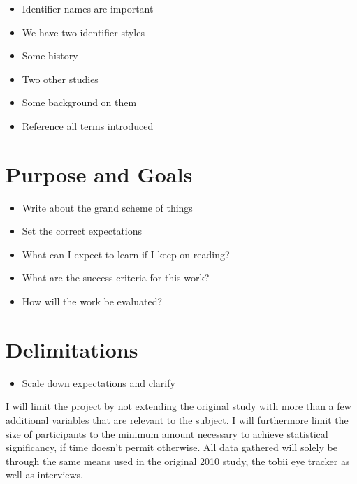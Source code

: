 \begin{itemize}
	\item Identifier names are important
	\item We have two identifier styles
	\item Some history 
	\item Two other studies
	\item Some background on them
	\item Reference all terms introduced
\end{itemize}

\section{Purpose and Goals}
\begin{itemize}
	\item Write about the grand scheme of things
	\item Set the correct expectations
	\item What can I expect to learn if I keep on reading?
	\item What are the success criteria for this work?
	\item How will the work be evaluated?
\end{itemize}

\section{Delimitations}
\begin{itemize}
	\item Scale down expectations and clarify
\end{itemize}

I will limit the project by not extending the original study with more than a few additional variables that are relevant to the subject. I will furthermore limit the size of participants to the minimum amount necessary to achieve statistical significancy, if time doesn't permit otherwise. All data gathered will solely be through the same means used in the original 2010 study, the tobii eye tracker as well as interviews.